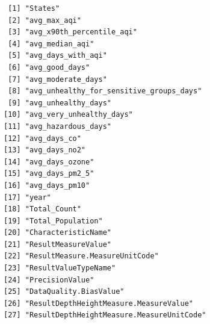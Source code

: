 \documentclass[
  12pt,
]{article}
\begin{document}
\begin{verbatim}
 [1] "States"                                  
 [2] "avg_max_aqi"                             
 [3] "avg_x90th_percentile_aqi"                
 [4] "avg_median_aqi"                          
 [5] "avg_days_with_aqi"                       
 [6] "avg_good_days"                           
 [7] "avg_moderate_days"                       
 [8] "avg_unhealthy_for_sensitive_groups_days" 
 [9] "avg_unhealthy_days"                      
[10] "avg_very_unhealthy_days"                 
[11] "avg_hazardous_days"                      
[12] "avg_days_co"                             
[13] "avg_days_no2"                            
[14] "avg_days_ozone"                          
[15] "avg_days_pm2_5"                          
[16] "avg_days_pm10"                           
[17] "year"                                    
[18] "Total_Count"                             
[19] "Total_Population"                        
[20] "CharacteristicName"                      
[21] "ResultMeasureValue"                      
[22] "ResultMeasure.MeasureUnitCode"           
[23] "ResultValueTypeName"                     
[24] "PrecisionValue"                          
[25] "DataQuality.BiasValue"                   
[26] "ResultDepthHeightMeasure.MeasureValue"   
[27] "ResultDepthHeightMeasure.MeasureUnitCode"
\end{verbatim}
\end{document}
